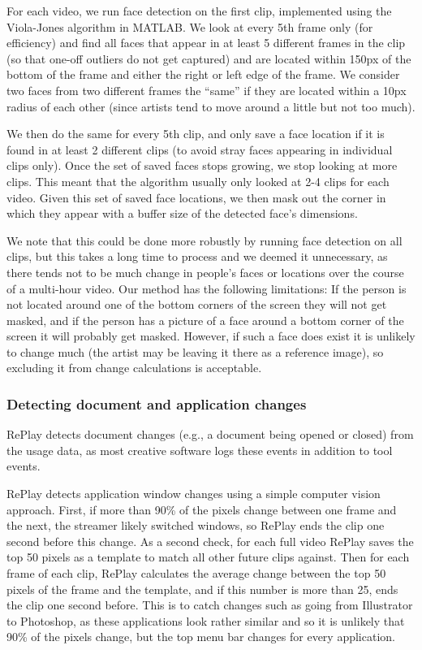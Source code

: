 For each video, we run face detection on the first clip, implemented using the Viola-Jones algorithm in MATLAB. We look at every 5th frame only (for efficiency) and find all faces that appear in at least 5 different frames in the clip (so that one-off outliers do not get captured) and are located within 150px of the bottom of the frame and either the right or left edge of the frame. We consider two faces from two different frames the ``same'' if they are located within a 10px radius of each other (since artists tend to move around a little but not too much). 

We then do the same for every 5th clip, and only save a face location if it is found in at least 2 different clips (to avoid stray faces appearing in individual clips only). Once the set of saved faces stops growing, we stop looking at more clips. This meant that the algorithm usually only looked at 2-4 clips for each video. Given this set of saved face locations, we then mask out the corner in which they appear with a buffer size of the detected face's dimensions.

We note that this could be done more robustly by running face detection on all clips, but this takes a long time to process and we deemed it unnecessary, as there tends not to be much change in people's faces or locations over the course of a multi-hour video. Our method has the following limitations: If the person is not located around one of the bottom corners of the screen they will not get masked, and if the person has a picture of a face around a bottom corner of the screen it will probably get masked. However, if such a face does exist it is unlikely to change much (the artist may be leaving it there as a reference image), so excluding it from change calculations is acceptable.

\subsubsection{Detecting document and application changes}
RePlay detects document changes (e.g., a document being opened or closed) from the usage data, as most creative software logs these events in addition to tool events. 

RePlay detects application window changes using a simple computer vision approach. First, if more than 90\% of the pixels change between one frame and the next, the streamer likely switched windows, so RePlay ends the clip one second before this change. As a second check, for each full video RePlay saves the top 50 pixels as a template to match all other future clips against. Then for each frame of each clip, RePlay calculates the average change between the top 50 pixels of the frame and the template, and if this number is more than 25, ends the clip one second before. This is to catch changes such as going from Illustrator to Photoshop, as these applications look rather similar and so it is unlikely that 90\% of the pixels change, but the top menu bar changes for every application.


